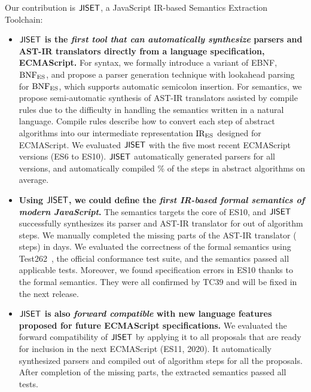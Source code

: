 Our contribution is \( \text{\sf JISET} \), a JavaScript IR-based Semantics Extraction
Toolchain:
\begin{itemize}[leftmargin=0.5cm]
  \item \textbf{\( \text{\sf JISET} \) is the \textit{first tool that can automatically synthesize}
    parsers and AST-IR translators directly from a language specification,
    ECMAScript.}  For syntax, we formally introduce a variant of EBNF, \( \text{BNF}_{\text{ES}} \),
    and propose a parser generation technique with
    lookahead parsing for \( \text{BNF}_{\text{ES}} \), which supports automatic semicolon
    insertion. For semantics, we propose semi-automatic synthesis of AST-IR
    translators assisted by compile rules due to the
    difficulty in handling the semantics written in a natural language.  Compile rules describe
    how to convert each step of abstract algorithms into our intermediate
    representation \( \text{IR}_\text{ES} \) designed for ECMAScript. We evaluated \( \text{\sf JISET} \)
    with the five most recent ECMAScript versions (ES6 to ES10).   \( \text{\sf JISET} \) automatically generated
    parsers for all versions, and automatically compiled
    \% of the steps in abstract algorithms on average.
  \item \textbf{ Using \( \text{\sf JISET} \), we could define the \textit{first IR-based
    formal semantics of modern JavaScript}.}  The semantics targets the
    core of ES10, and \( \text{\sf JISET} \) successfully synthesizes its
    parser and AST-IR translator for  out of 
    algorithm steps.  We manually completed the missing parts of the AST-IR
    translator ( steps) in  days.  We evaluated the correctness
    of the formal semantics using Test262~\cite{test262}, the official
    conformance test suite, and the semantics passed all 
    applicable tests.  Moreover, we found  specification errors in ES10
    thanks to the formal semantics.  They were all confirmed by TC39 and will be
    fixed in the next release.
  \item \textbf{\( \text{\sf JISET} \) is also \textit{forward compatible} with new language features
    proposed for future ECMAScript specifications.}  
     We evaluated the forward compatibility of \( \text{\sf JISET} \) by applying it
     to all  proposals that are ready for inclusion in the next ECMAScript  (ES11, 2020).
    It automatically synthesized parsers and
    compiled  out of  algorithm steps for all the proposals.
    After completion of the missing parts, the extracted semantics passed all  tests.
\end{itemize}
